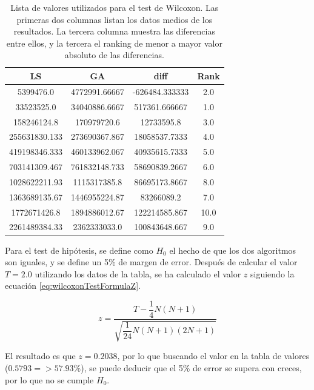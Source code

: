 \documentclass[10pt,a4paper]{article}
\begin{document}
\begin{table}
\begin{center}
\begin{tabular}{|c|c|c|c|}
\hline
LS	 & 	GA	 &	diff	&	Rank	 \\
\hline
5399476.0	 & 	4772991.66667	 & 	-626484.333333	 &	2.0	 \\
\hline
33523525.0	 & 	34040886.6667	 &	517361.666667	 &	1.0	 \\
\hline
158246124.8	 &	170979720.6	 & 	12733595.8	 & 	3.0	 \\
\hline
255631830.133	 & 	273690367.867	 & 	18058537.7333	 & 	4.0	 \\
\hline
419198346.333	 & 	460133962.067	 & 	40935615.7333	 & 	5.0	 \\
\hline
703141309.467	 & 	761832148.733	 &	58690839.2667	 & 	6.0	 \\
\hline
1028622211.93	 & 	1115317385.8	 & 	86695173.8667	 & 	8.0	 \\
\hline
1363689135.67	 &	1446955224.87	 &	83266089.2	 & 	7.0	 \\
\hline
1772671426.8	 & 	1894886012.67	 &	122214585.867	 &	10.0	 \\
\hline
2261489384.33	 & 	2362333033.0	 & 	100843648.667	 &	9.0	 \\
\hline
\end{tabular}
\end{center}
\caption{Lista de valores utilizados para el test de Wilcoxon. Las primeras dos columnas listan los datos medios de los resultados. La tercera columna muestra las diferencias entre ellos, y la tercera el ranking de menor a mayor valor absoluto de las diferencias.}
\label{tab:wilcoxonTest}
\end{table}

Para el test de hipótesis, se define como $H_0$ el hecho de que los dos algoritmos son iguales, y se define un 5\% de margen de error. Después de calcular el valor $T=2.0$ utilizando los datos de la tabla, se ha calculado el valor $z$ siguiendo la ecuación \ref{eq:wilcoxonTestFormulaZ}.

\begin{equation}
z=\dfrac{T-\dfrac{1}{4}N(N+1)}{\sqrt{\dfrac{1}{24}N(N+1)(2N+1)}}
\label{eq:wilcoxonTestFormulaZ}
\end{equation}

El resultado es que $z=0.2038$, por lo que buscando el valor en la tabla de valores ($0.5793=>57.93\%$), se puede deducir que el 5\% de error se supera con creces, por lo que no se cumple $H_0$.
\end{document}
